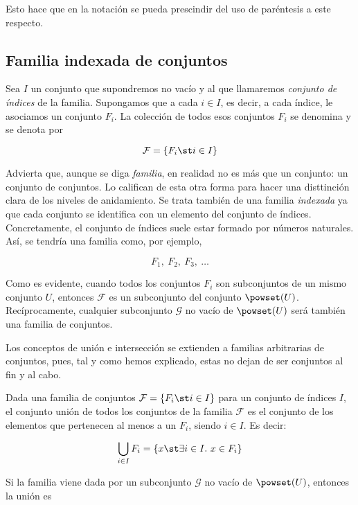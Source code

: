 \noindent Esto hace que en la notación se pueda prescindir del uso de
paréntesis a este respecto.





\subsection{Familia indexada de conjuntos}

Sea $I$ un conjunto que supondremos no vacío y al que llamaremos
\emph{conjunto de índices} de la familia. Supongamos que a cada $i \in I$,
es decir, a cada índice, le asociamos un conjunto $F_i$. La colección de
todos esos conjuntos $F_i$ se denomina  y se
denota por

$$ \mathcal{F} = \{F_i \st i \in I \} $$

\noindent Advierta que, aunque se diga \emph{familia}, en realidad no es más
que un conjunto: un conjunto de conjuntos. Lo califican de esta otra forma
para hacer una disttinción clara de los niveles de anidamiento. Se trata
también de una familia \emph{indexada} ya que cada conjunto se identifica
con un elemento del conjunto de índices. Concretamente, el conjunto de
índices suele estar formado por números naturales. Así, se tendría una
familia como, por ejemplo,

\[ F_1,\ F_2,\ F_3,\ \dots \]

Como es evidente, cuando todos los conjuntos $F_i$ son subconjuntos de un
mismo conjunto $U$, entonces $\mathcal{F}$ es un subconjunto del conjunto
$\powset(U)$. Recíprocamente, cualquier subconjunto $\mathcal{G}$ no vacío
de $\powset(U)$ será también una familia de conjuntos.


Los conceptos de unión e intersección se extienden a familias arbitrarias de
conjuntos, pues, tal y como hemos explicado, estas no dejan de ser conjuntos
al fin y al cabo.

Dada una familia de conjuntos $\mathcal{F} = \{F_i \st i \in I\}$ para un
conjunto de índices $I$, el conjunto unión de todos los conjuntos de la
familia $\mathcal{F}$ es el conjunto de los elementos que pertenecen al
menos a un $F_i$, siendo $i \in I$. Es decir:

$$ \bigcup_{i \in I} F_i = \{x \st \exists i \in I. \ x \in F_i\} $$

Si la familia viene dada por un subconjunto $\mathcal{G}$ no vacío de
$\powset(U)$, entonces la unión es

